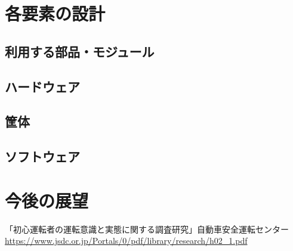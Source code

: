 \documentclass[titlepage,a4paper]{jsarticle}
\begin{document}
\section{各要素の設計}
\subsection{利用する部品・モジュール}
\subsection{ハードウェア}
\subsection{筐体}
\subsection{ソフトウェア}

\section{今後の展望}

\begin{thebibliography}{99}
   「初心運転者の運転意識と実態に関する調査研究」自動車安全運転センター\\
  \url{https://www.jsdc.or.jp/Portals/0/pdf/library/research/h02_1.pdf}

\end{thebibliography}
\end{document}
